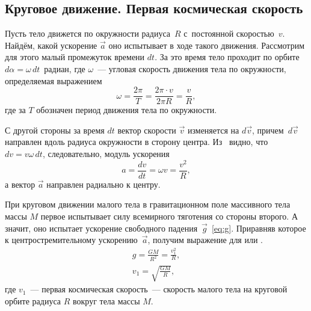 \subsection{Круговое движение. Первая космическая скорость}

Пусть тело движется по окружности радиуса~$R$ с~постоянной скоростью~$v$. Найдём, какой ускорение $\vec a$ оно испытывает в ходе такого движения. Рассмотрим для этого малый промежуток времени $dt$. За это время тело проходит по орбите $d\alpha = \omega \, dt$~радиан, где $\omega$~--- угловая скорость движения тела по окружности, определяемая выражением
\begin{equation*}
    \omega = \frac{2 \pi}{T} = \frac{ 2\pi \cdot v}{2\pi R} = \frac{v}{R},
\end{equation*}
где за $T$ обозначен период движения тела по окружности.

С другой стороны за время $dt$ вектор скорости $\vec{v}$ изменяется на $d \vec{v}$, причем~$d \vec{v}$ направлен вдоль радиуса окружности в сторону центра. Из~ видно, что $d v = v \omega \, dt$, следовательно, модуль ускорения
\begin{equation*}
    a = \frac{dv}{dt} = \omega v = \frac{v^2}{R},
\end{equation*}
а вектор $\vec a$ направлен радиально к центру.

При круговом движении малого тела в гравитационном поле массивного тела массы $M$ первое испытывает силу всемирного тяготения со стороны второго. А значит, оно испытает ускорение свободного падения~$\vec{g}$~\eqref{eq:g}. Приравняв которое к центростремительному ускорению~$\vec{a}$, получим выражение для  или .
\begin{gather}
    g = \frac{G M}{R^2} = \frac{v_1^2}{R},\nonumber\\
    v_1 = \sqrt{\frac{GM}{R}},
\end{gather}
где $v_1$~--- первая космическая скорость~--- скорость малого тела на круговой орбите радиуса $R$ вокруг тела массы $M$.
